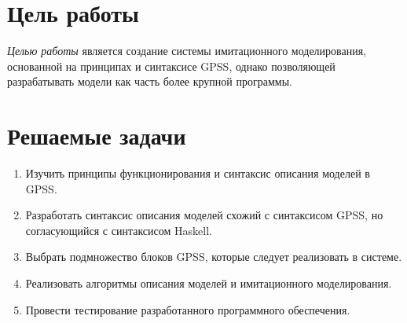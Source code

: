 \documentclass[12pt]{article}
\begin{document}

\TitleSlide


\section{Цель работы}

\emph{Целью работы} является создание системы имитационного
моделирования, основанной на принципах и синтаксисе GPSS, однако позволяющей разрабатывать модели как часть более крупной программы.


\section{Решаемые задачи}

\begin{enumerate}
\item Изучить принципы функционирования и синтаксис описания моделей в GPSS.
\item Разработать синтаксис описания моделей схожий с синтаксисом
GPSS, но согласующийся с синтаксисом Haskell.
\item Выбрать подмножество блоков GPSS, которые следует реализовать
в системе.
\item Реализовать алгоритмы описания моделей и имитационного моделирования.
\item Провести тестирование разработанного программного обеспечения.
\end{enumerate}



\end{document}
